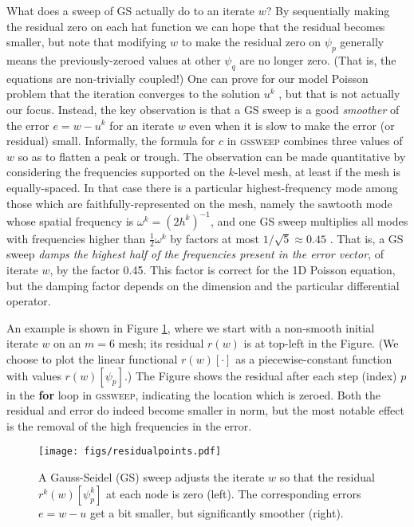 \documentclass[letterpaper,final,12pt,reqno]{amsart}
\begin{document}
What does a sweep of GS actually do to an iterate $w$?  By sequentially making the residual zero on each hat function we can hope that the residual becomes smaller, but note that modifying $w$ to make the residual zero on $\psi_p$ generally means the previously-zeroed values at other $\psi_q$ are no longer zero.  (That is, the equations are non-trivially coupled!)  One can prove for our model Poisson problem that the iteration converges to the solution $u^k$ \cite[for example]{Greenbaum1997}, but that is not actually our focus.  Instead, the key observation is that a GS sweep is a good \emph{smoother} of the error $e=w-u^k$ for an iterate $w$ even when it is slow to make the error (or residual) small.  Informally, the formula for $c$ in \textsc{gssweep} combines three values of $w$ so as to flatten a peak or trough.  The observation can be made quantitative by considering the frequencies supported on the $k$-level mesh, at least if the mesh is equally-spaced.  In that case there is a particular highest-frequency mode among those which are faithfully-represented on the mesh, namely the sawtooth mode whose spatial frequency is $\omega^k=(2h^k)^{-1}$, and one GS sweep multiplies all modes with frequencies higher than $\frac{1}{2} \omega^k$ by factors at most $1/\sqrt{5}\approx 0.45$ \cite[Chapter 4]{Briggsetal2000}.  That is, a GS sweep \emph{damps the highest half of the frequencies present in the error vector}, of iterate $w$, by the factor 0.45.  This factor is correct for the 1D Poisson equation, but the damping factor depends on the dimension and the particular differential operator.

An example is shown in Figure \ref{fig:residualpoints}, where we start with a non-smooth initial iterate $w$ on an $m=6$ mesh; its residual $r(w)$ is at top-left in the Figure.  (We choose to plot the linear functional $r(w)[\cdot]$ as a piecewise-constant function with values $r(w)[\psi_p]$.)  The Figure shows the residual after each step (index) $p$ in the \textbf{for} loop in \textsc{gssweep}, indicating the location which is zeroed.  Both the residual and error do indeed become smaller in norm, but the most notable effect is the removal of the high frequencies in the error.

\begin{figure}
\texttt{[image: figs/residualpoints.pdf]}
\caption{A Gauss-Seidel (GS) sweep adjusts the iterate $w$ so that the residual $r^k(w)[\psi_p^k]$ at each node is zero (left).  The corresponding errors $e=w-u$ get a bit smaller, but significantly smoother (right).}
\label{fig:residualpoints}
\end{figure}
\end{document}
